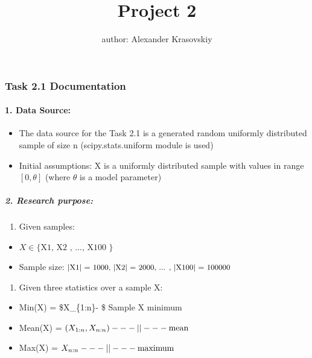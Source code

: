 \documentclass[11pt]{article}
\title{Project 2}
\author{author: Alexander Krasovskiy}
\providecommand{\tightlist}{%
      \setlength{\itemsep}{0pt}\setlength{\parskip}{0pt}}
\begin{document}
    
    \maketitle
    
    

    \hypertarget{task-2.1-documentation}{%
\subsubsection{Task 2.1 Documentation}\label{task-2.1-documentation}}

    \hypertarget{data-source}{%
\paragraph{1. Data Source:}\label{data-source}}

\begin{itemize}
\tightlist
\item
  The data source for the Task 2.1 is a generated random uniformly
  distributed sample of size n (scipy.stats.uniform module is used)
\item
  Initial assumptions: X is a uniformly distributed sample with values in
  range \([0,\theta]\) (where \(\theta\) is a model parameter)
\end{itemize}

    \hypertarget{research-purpose}{%
\subparagraph{2. Research purpose: }\label{research-purpose}}

\begin{enumerate}
\def\labelenumi{\arabic{enumi}.}
\tightlist
\item
  Given samples:
\end{enumerate}

\begin{itemize}
\tightlist
\item
  \(X \in \text{\{ X1, X2 , ..., X100 \}}\)
\item
  Sample size:
  \(\small{\text{|X1| = 1000, |X2| = 2000, ... , |X100| = 100000}}\)
\end{itemize}

\vspace{15px}
\begin{enumerate}
\def\labelenumi{\arabic{enumi}.}
\setcounter{enumi}{1}
\tightlist
\item
  Given three statistics over a sample X:
\end{enumerate}

\begin{itemize}
\tightlist
\item
  Min(X) = \$\space\space X\_\{1:n\}\space\space  - \$ Sample X minimum
\item
  Mean(X) =
  \(\space\space (X_{1:n}, X_{n:n})\space\space ---||--- \text{mean}\)
\item
  Max(X) = \(\space\space X_{n:n}\space\space ---||--- \text{maximum}\)
\end{itemize}
\end{document}
